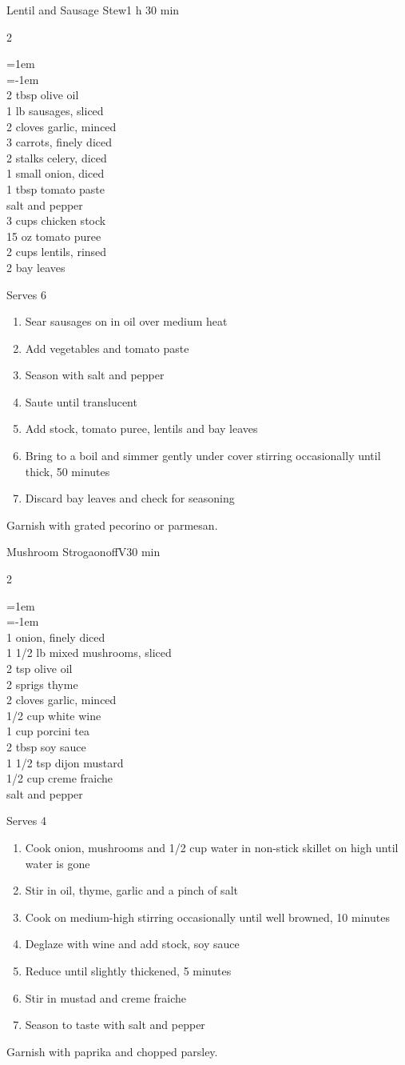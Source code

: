\documentclass{article}
\newenvironment{recipe}[3][]
    {\begin{cardbase}[#1]{#2}{#3}
    \columnratio{0.333}
    \begin{paracol}{2}}
    {\end{paracol}\end{cardbase}}
\newenvironment{denserecipe}[3][]
    {\small
    \begin{recipe}[#1]{#2}{#3}}
    {\end{recipe}}
\newcommand{\nextcolumn}{\switchcolumn}
\newenvironment{ingredients}
    {
    \begin{obeylines}
    \vspace{\parskip}
    \setlength{\parskip}{0.25em}
    \vspace{-0.25em}
    \leftskip=1em
    \parindent=-1em}
    {\end{obeylines}}
\newenvironment{steps}
    {\begin{enumerate}[leftmargin=*,topsep=0pt]}
    {\end{enumerate}}
\newcommand{\tag}[1]{\hspace{1em}#1}
\newcommand{\symboltag}[2]{\tag{#1\hspace{0.4em}#2}}
\newcommand{\totaltime}[1]{\symboltag{\raisebox{-0.1em}{\small\StopWatchEnd}}{#1}}
\begin{document}
\begin{denserecipe}{Lentil and Sausage Stew}{\totaltime{1 h 30 min}}
\begin{ingredients}
2 tbsp olive oil
1 lb sausages, sliced
2 cloves garlic, minced
3 carrots, finely diced
2 stalks celery, diced
1 small onion, diced
1 tbsp tomato paste
salt and pepper
3 cups chicken stock
15 oz tomato puree
2 cups lentils, rinsed
2 bay leaves
\end{ingredients}
\nextcolumn
Serves 6
\begin{steps}
    \item Sear sausages on in oil over medium heat
    \item Add vegetables and tomato paste
    \item Season with salt and pepper
    \item Saute until translucent
    \item Add stock, tomato puree, lentils and bay leaves
    \item Bring to a boil and simmer gently under cover stirring occasionally until thick, 50 minutes
    \item Discard bay leaves and check for seasoning
\end{steps}
Garnish with grated pecorino or parmesan.
\end{denserecipe}

\begin{denserecipe}{Mushroom Strogaonoff}{\tag{V}\totaltime{30 min}}
\begin{ingredients}
1 onion, finely diced
1 1/2 lb mixed mushrooms, sliced
2 tsp olive oil
2 sprigs thyme
2 cloves garlic, minced
1/2 cup white wine
1 cup porcini tea
2 tbsp soy sauce
1 1/2 tsp dijon mustard
1/2 cup creme fraiche
salt and pepper
\end{ingredients}
\nextcolumn
Serves 4
\begin{steps}
    \item Cook onion, mushrooms and 1/2 cup water in non-stick skillet on high until water is gone
    \item Stir in oil, thyme, garlic and a pinch of salt
    \item Cook on medium-high stirring occasionally until well browned, 10 minutes
    \item Deglaze with wine and add stock, soy sauce
    \item Reduce until slightly thickened, 5 minutes
    \item Stir in mustad and creme fraiche
    \item Season to taste with salt and pepper
\end{steps}
Garnish with paprika and chopped parsley.
\end{denserecipe}
\end{document}
